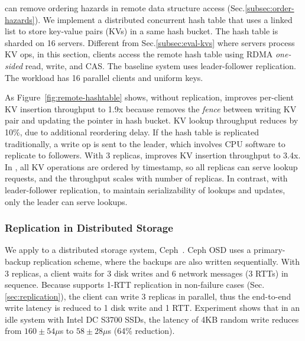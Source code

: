 \sys{} can remove ordering hazards in remote data structure access (Sec.\ref{subsec:order-hazards}).
We implement a distributed concurrent hash table that uses a linked list to store key-value pairs (KVs) in a same hash bucket. The hash table is sharded on 16 servers.
Different from Sec.\ref{subsec:eval-kvs} where servers process KV ops, in this section, clients access the remote hash table using RDMA \emph{one-sided} read, write, and CAS.
The baseline system uses leader-follower replication.
The workload has 16 parallel clients and uniform keys.

As Figure~\ref{fig:remote-hashtable} shows, without replication, \sys{} improves per-client KV insertion throughput to 1.9x because \sys{} removes the \emph{fence} between writing KV pair and updating the pointer in hash bucket.
KV lookup throughput reduces by 10\%, due to additional reordering delay.
If the hash table is replicated traditionally, a write op is sent to the leader, which involves CPU software to replicate to followers.
With 3 replicas, \sys{} improves KV insertion throughput to 3.4x.
In \sys{}, all KV operations are ordered by timestamp, so all replicas can serve lookup requests, and the throughput scales with number of replicas.
In contrast, with leader-follower replication, to maintain serializability of lookups and updates, only the leader can serve lookups.


\subsubsection{Replication in Distributed Storage}
\label{subsec:ceph}

We apply \sys{} to a distributed storage system, Ceph~\cite{weil2006ceph}. Ceph OSD uses a primary-backup replication scheme, where the backups are also written sequentially. With 3 replicas, a client waits for 3 disk writes and 6 network messages (3 RTTs) in sequence. Because \sys{} supports 1-RTT replication in non-failure cases (Sec.\ref{sec:replication}), the client can write 3 replicas in parallel, thus the end-to-end write latency is reduced to 1 disk write and 1 RTT. Experiment shows that in an idle system with Intel DC S3700 SSDs, the latency of 4KB random write reduces from $160 \pm 54 \mu$s to $58 \pm 28 \mu$s (64\% reduction).



